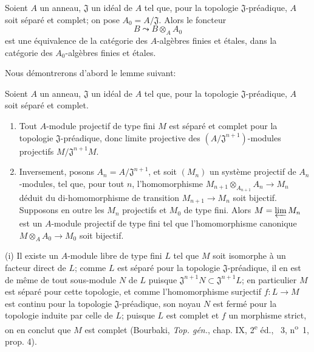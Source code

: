 \begin{proposition}[18.3.2]
\label{IV.18.3.2}
Soient $A$ un anneau, $\mathfrak J$ un idéal de $A$ tel que, pour la topologie $\mathfrak J$-préadique, $A$ soit séparé et complet; on pose $A_0=A/\mathfrak J$. Alors le foncteur
\[
  B\leadsto B\otimes_A A_0
\]
est une équivalence de la catégorie des $A$-algèbres finies et étales, dans la catégorie des $A_0$-algèbres finies et étales.
\end{proposition}

Nous démontrerons d'abord le lemme suivant:

\begin{lemma}[18.3.2.1]
\label{IV.18.3.2.1}
Soient $A$ un anneau, $\mathfrak J$ un idéal de $A$ tel que, pour la topologie $\mathfrak J$-préadique, $A$ soit séparé et complet.
\begin{enumerate}
  \item[\textup{(i)}] Tout $A$-module projectif de type fini $M$ est séparé et complet pour la topologie $\mathfrak J$-préadique, donc limite projective des $(A/\mathfrak J^{n+1})$-modules projectifs $M/\mathfrak J^{n+1}M$.
  \item[\textup{(ii)}] Inversement, posons $A_n=A/\mathfrak J^{n+1}$, et soit $(M_n)$ un système projectif de $A_n$-modules, tel que, pour tout $n$, l'homomorphisme $M_{n+1}\otimes_{A_{n+1}}A_n\to M_n$ déduit du di-homomorphisme de transition $M_{n+1}\to M_n$ soit bijectif. Supposons en outre les $M_n$ projectifs et $M_0$ de type fini. Alors $M=\varprojlim M_n$ est un $A$-module projectif de type fini tel que l'homomorphisme canonique $M\otimes_A A_0\to M_0$ soit bijectif.
\end{enumerate}
\end{lemma}

(i) Il existe un $A$-module libre de type fini $L$ tel que $M$ soit isomorphe à un facteur direct de $L$; comme $L$ est séparé pour la topologie $\mathfrak J$-préadique, il en est de même de tout sous-module $N$ de $L$ puisque $\mathfrak J^{n+1}N\subset\mathfrak J^{n+1}L$; en particulier $M$ est séparé pour cette topologie, et comme l'homomorphisme surjectif $f:L\to M$ est continu pour la topologie $\mathfrak J$-préadique, son noyau $N$ est fermé pour la topologie induite par celle de $L$; puisque $L$ est complet et $f$ un morphisme strict, on en conclut que $M$ est complet (Bourbaki, \emph{Top. gén.}, chap. IX, 2\textsuperscript{e} éd., \textsection~3, n\textsuperscript{o}~1, prop. 4).

